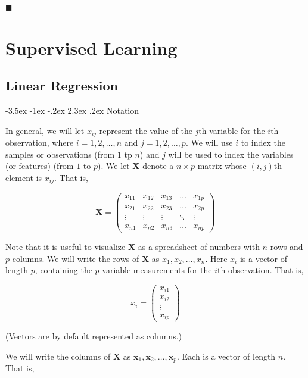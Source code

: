 \documentclass[]{book}
\makeatletter
\renewcommand\section{\@startsection {section}{1}{\z@}%
                                   {-3.5ex \@plus -1ex \@minus -.2ex}%
                                   {2.3ex \@plus.2ex}%
                                   {\normalfont\Large\bfseries\color{ForestGreen}}}
\theoremstyle{definition}
\theoremstyle{definition}
\theoremstyle{definition}
\theoremstyle{remark}
\makeatother
\begin{document}
◼

\part{Supervised Learning}\label{part-supervised-learning}

\chapter{Linear Regression}\label{linear-regression}

\section{Notation}\label{notation}

In general, we will let \(x_{ij}\) represent the value of the \(j\)th
variable for the \(i\)th observation, where \(i=1,2,\ldots,n\) and
\(j=1,2,\ldots,p\). We will use \(i\) to index the samples or
observations (from \(1\) tp \(n\)) and \(j\) will be used to index the
variables (or features) (from \(1\) to \(p\)). We let \(\textbf{X}\)
denote a \(n \times p\) matrix whose \((i,j)\)th element is \(x_{ij}\).
That is,

\[ \textbf{X}  = \begin{pmatrix}
    x_{11} & x_{12} & x_{13} & \dots  & x_{1p} \\
    x_{21} & x_{22} & x_{23} & \dots  & x_{2p} \\
    \vdots & \vdots & \vdots & \ddots & \vdots \\
    x_{n1} & x_{n2} & x_{n3} & \dots  & x_{np}
\end{pmatrix} \]

Note that it is useful to visualize \(\textbf{X}\) as a spreadsheet of
numbers with \(n\) rows and \(p\) columns. We will write the rows of
\(\textbf{X}\) as \(x_1 , x_2 , \ldots, x_n\). Here \(x_i\) is a vector
of length \(p\), containing the \(p\) variable measurements for the
\(i\)th observation. That is,

\[ x_i = \begin{pmatrix}
    x_{i1} \\
    x_{i2} \\
    \vdots \\
    x_{ip}
\end{pmatrix}\]

(Vectors are by default represented as columns.)

We will write the columns of \(\textbf{X}\) as
\(\textbf{x}_1 , \textbf{x}_2, \ldots, \textbf{x}_p\). Each is a vector
of length \(n\). That is,
\end{document}
